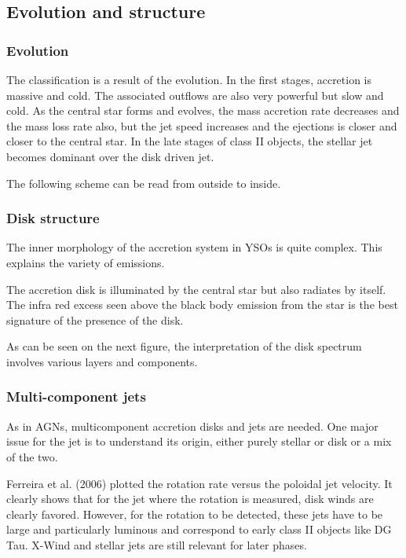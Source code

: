 \documentclass[10pt,a4paper,english,draft]{article}
\begin{document}
\subsection{Evolution and structure}

\subsubsection{Evolution}
The classification is a result of the evolution. In the first stages, accretion is massive and cold. The associated outflows are also very powerful but slow and cold. As the central star forms and evolves, the mass accretion rate decreases and the mass loss rate also, but the jet speed increases and the ejections is closer and closer to the central star. In the late stages of class II objects, the stellar jet becomes dominant over the disk driven jet.

The following scheme can be read from outside to inside.
\subsubsection{Disk structure}

The inner morphology of the accretion system in YSOs is quite complex. This explains the variety of emissions.

The accretion disk is illuminated by the central star but also radiates by itself. The infra red excess seen above the black body emission from the star is the best signature of the presence of the disk.

As can be seen on the next figure, the interpretation of the disk spectrum involves various layers and components.

\subsubsection{Multi-component jets}
As in AGNs, multicomponent accretion disks and jets are needed. One major issue for the jet is to understand its origin, either purely stellar or disk or a mix of the two.

Ferreira et al. (2006) plotted the rotation rate versus the poloidal jet velocity. It clearly shows that for the jet where the rotation is measured, disk winds are clearly favored. However, for the rotation to be detected, these jets have to be large and particularly luminous and correspond to early class II objects like DG Tau. X-Wind and stellar jets are still relevant for later phases.
\end{document}
